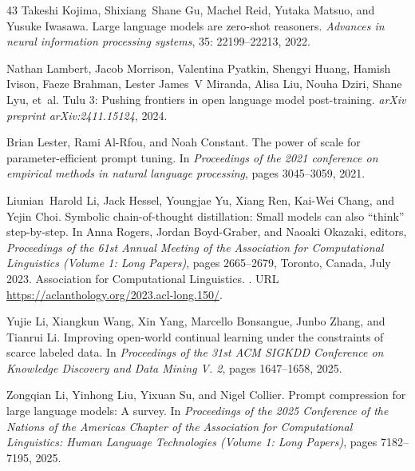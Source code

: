 \begin{thebibliography}{43}
Takeshi Kojima, Shixiang~Shane Gu, Machel Reid, Yutaka Matsuo, and Yusuke Iwasawa.
\newblock Large language models are zero-shot reasoners.
\newblock \emph{Advances in neural information processing systems}, 35: 22199--22213, 2022.

Nathan Lambert, Jacob Morrison, Valentina Pyatkin, Shengyi Huang, Hamish Ivison, Faeze Brahman, Lester James~V Miranda, Alisa Liu, Nouha Dziri, Shane Lyu, et~al.
\newblock Tulu 3: Pushing frontiers in open language model post-training.
\newblock \emph{arXiv preprint arXiv:2411.15124}, 2024.

Brian Lester, Rami Al-Rfou, and Noah Constant.
\newblock The power of scale for parameter-efficient prompt tuning.
\newblock In \emph{Proceedings of the 2021 conference on empirical methods in natural language processing}, pages 3045--3059, 2021.

Liunian~Harold Li, Jack Hessel, Youngjae Yu, Xiang Ren, Kai-Wei Chang, and Yejin Choi.
\newblock Symbolic chain-of-thought distillation: Small models can also ``think'' step-by-step.
\newblock In Anna Rogers, Jordan Boyd-Graber, and Naoaki Okazaki, editors, \emph{Proceedings of the 61st Annual Meeting of the Association for Computational Linguistics (Volume 1: Long Papers)}, pages 2665--2679, Toronto, Canada, July 2023. Association for Computational Linguistics.
\newblock {}.
\newblock URL \url{https://aclanthology.org/2023.acl-long.150/}.

Yujie Li, Xiangkun Wang, Xin Yang, Marcello Bonsangue, Junbo Zhang, and Tianrui Li.
\newblock Improving open-world continual learning under the constraints of scarce labeled data.
\newblock In \emph{Proceedings of the 31st ACM SIGKDD Conference on Knowledge Discovery and Data Mining V. 2}, pages 1647--1658, 2025{}.

Zongqian Li, Yinhong Liu, Yixuan Su, and Nigel Collier.
\newblock Prompt compression for large language models: A survey.
\newblock In \emph{Proceedings of the 2025 Conference of the Nations of the Americas Chapter of the Association for Computational Linguistics: Human Language Technologies (Volume 1: Long Papers)}, pages 7182--7195, 2025{}.


\end{thebibliography}
